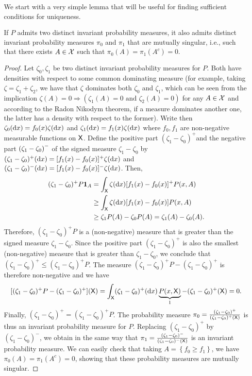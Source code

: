 \documentclass[english,graybox,envcountchap,envcountsame,sectrefs,shortlabels]{svmono}
\theoremstyle{style}
\newenvironment{svmultproof}{\small \begin{proof}}{\end{proof}}
\newcommand{\bfr}{\begin{framed}}
\newcommand{\efr}{\end{framed}}
\begin{document}
We start with a very simple lemma that will be useful for finding
sufficient conditions for uniqueness. \bfr
\begin{lemma}
\label{lem:invariant:singular} If $P$ admits two distinct invariant
probability measures, it also admits distinct invariant probability
measures $\pi_{0}$ and $\pi_{1}$ that are mutually singular, i.e.,
such that there exists $A\in\mathcal{X}$ such that $\pi_{0}(A)=\pi_{1}(A^{c})=0$.
\end{lemma}
\efr
\begin{svmultproof}
Let $\zeta_{0},\zeta_{1}$ be two distinct invariant probability measures
for $P$. Both have densities with respect to some common dominating
measure (for example, taking $\zeta=\zeta_{1}+\zeta_{2}$, we have
that $\zeta$ dominates both $\zeta_{0}$ and $\zeta_{1}$, which
can be seen from the implication $\zeta(A)=0\Rightarrow(\zeta_{1}(A)=0\mbox{ and }\zeta_{2}(A)=0)$
for any $A\in\mathcal{X}$ and according to the Radon Nikodym theorem,
if a measure dominates another one, the latter has a density with
respect to the former). Write then $\zeta_{0}(\mathrm{d} x)=f_{0}(x)\zeta(\mathrm{d} x)$
and $\zeta_{1}(\mathrm{d} x)=f_{1}(x)\zeta(\mathrm{d} x)$ where $f_{0},f_{1}$
are non-negative measurable functions on $\mathsf{X}$. Define the positive
part  $(\zeta_{1}-\zeta_{0})^{+}$and the negative part $\left(\zeta_{1}-\zeta_{0}\right)^{-}$
of the signed measure $\zeta_{1}-\zeta_{0}$ by $(\zeta_{1}-\zeta_{0})^{+}(\mathrm{d} x)=[f_{1}(x)-f_{0}(x)]^{+}\zeta(\mathrm{d} x)$
and $(\zeta_{1}-\zeta_{0})^{-}(\mathrm{d} x)=[f_{1}(x)-f_{0}(x)]^{-}\zeta(\mathrm{d} x)$.
Then,
\begin{align*}
(\zeta_{1}-\zeta_{0})^{+}P\mathbf{1}_{A} & =\int_{\mathsf{X}}\zeta(\mathrm{d} x)[f_{1}(x)-f_{0}(x)]^{+}P(x,A)\\
 & \geq\int_{\mathsf{X}}\zeta(\mathrm{d} x)[f_{1}(x)-f_{0}(x)]P(x,A)\\
 & \geq\zeta_{1}P(A)-\zeta_{0}P(A)=\zeta_{1}(A)-\zeta_{0}(A).
\end{align*}
Therefore, $(\zeta_{1}-\zeta_{0})^{+}P$ is a (non-negative) measure that
is greater than the signed measure $\zeta_{1}-\zeta_{0}$. Since the
positive part $(\zeta_{1}-\zeta_{0})^{+}$ is also the smallest (non-negative)
measure that is greater than $\zeta_{1}-\zeta_{0}$, we conclude that
$(\zeta_{1}-\zeta_{0})^{+}\leq(\zeta_{1}-\zeta_{0})^{+}P$. The measure
$(\zeta_{1}-\zeta_{0})^{+}P-(\zeta_{1}-\zeta_{0})^{+}$ is therefore
non-negative and we have
\[
[(\zeta_{1}-\zeta_{0})^{+}P-(\zeta_{1}-\zeta_{0})^{+}](\mathsf{X})=\int_{\mathsf{X}}(\zeta_{1}-\zeta_{0})^{+}(\mathrm{d} x)\underbrace{P(x,\mathsf{X})}_{1}-(\zeta_{1}-\zeta_{0})^{+}(\mathsf{X})=0.
\]
Finally, $(\zeta_{1}-\zeta_{0})^{+}=(\zeta_{1}-\zeta_{0})^{+}P$.
The probability measure $\pi_{0}=\frac{(\zeta_{1}-\zeta_{0})^{+}}{(\zeta_{1}-\zeta_{0})^{+}(\mathsf{X})}$
is thus an invariant probability measure for $P$. Replacing $(\zeta_{1}-\zeta_{0})^{+}$
by $(\zeta_{1}-\zeta_{0})^{-}$, we obtain in the same way that $\pi_{1}=\frac{(\zeta_{1}-\zeta_{0})^{-}}{(\zeta_{1}-\zeta_{0})^{-}(\mathsf{X})}$
is an invariant probability measure. We can easily check that taking
$A=\left\{ f_{0}\geq f_{1}\right\} $, we have $\pi_{0}(A)=\pi_{1}(A^{c})=0$,
showing that these probability measures are mutually singular.
\end{svmultproof}
\end{document}
